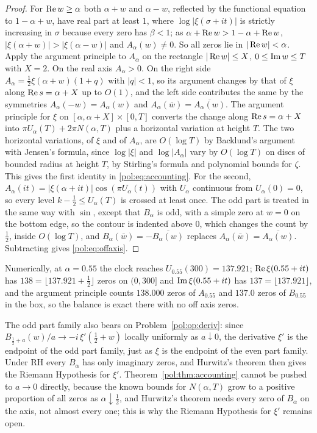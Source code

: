 \begin{proof}
For $\operatorname{Re} w\ge\alpha$ both $\alpha+w$ and $\alpha-w$, reflected by the functional equation to $1-\alpha+w$, have real part at least $1$, where $\log|\xi(\sigma+it)|$ is strictly increasing in $\sigma$ because every zero has $\beta<1$; as $\alpha+\operatorname{Re} w>1-\alpha+\operatorname{Re} w$, $|\xi(\alpha+w)|>|\xi(\alpha-w)|$ and $A_\alpha(w)\ne0$. So all zeros lie in $|\operatorname{Re} w|<\alpha$. Apply the argument principle to $A_\alpha$ on the rectangle $|\operatorname{Re} w|\le X$, $0\le\operatorname{Im} w\le T$ with $X=2$. On the real axis $A_\alpha>0$. On the right side $A_\alpha=\frac12\xi(\alpha+w)(1+q)$ with $|q|<1$, so its argument changes by that of $\xi$ along $\operatorname{Re} s=\alpha+X$ up to $O(1)$, and the left side contributes the same by the symmetries $A_\alpha(-w)=A_\alpha(w)$ and $A_\alpha(\bar w)=\overline{A_\alpha(w)}$. The argument principle for $\xi$ on $[\alpha,\alpha+X]\times[0,T]$ converts the change along $\operatorname{Re} s=\alpha+X$ into $\pi U_\alpha(T)+2\pi N(\alpha,T)$ plus a horizontal variation at height $T$. The two horizontal variations, of $\xi$ and of $A_\alpha$, are $O(\log T)$ by Backlund's argument \cite{Backlund} with Jensen's formula, since $\log|\xi|$ and $\log|A_\alpha|$ vary by $O(\log T)$ on discs of bounded radius at height $T$, by Stirling's formula and polynomial bounds for $\zeta$. This gives the first identity in \eqref{pol:eq:accounting}. For the second, $A_\alpha(it)=|\xi(\alpha+it)|\cos(\pi U_\alpha(t))$ with $U_\alpha$ continuous from $U_\alpha(0)=0$, so every level $k-\frac12\le U_\alpha(T)$ is crossed at least once. The odd part is treated in the same way with $\sin$, except that $B_\alpha$ is odd, with a simple zero at $w=0$ on the bottom edge, so the contour is indented above $0$, which changes the count by $\frac12$, inside $O(\log T)$, and $B_\alpha(\bar w)=-\overline{B_\alpha(w)}$ replaces $A_\alpha(\bar w)=\overline{A_\alpha(w)}$. Subtracting gives \eqref{pol:eq:offaxis}.
\end{proof}

Numerically, at $\alpha=0.55$ the clock reaches $U_{0.55}(300)=137.921$; $\operatorname{Re}\xi(0.55+it)$ has $138=\lfloor137.921+\frac12\rfloor$ zeros on $(0,300]$ and $\operatorname{Im}\xi(0.55+it)$ has $137=\lfloor137.921\rfloor$, and the argument principle counts $138.000$ zeros of $A_{0.55}$ and $137.0$ zeros of $B_{0.55}$ in the box, so the balance is exact there with no off axis zeros.

The odd part family also bears on Problem~\ref{pol:op:deriv}: since $B_{\frac12+a}(w)/a\to-i\,\xi'(\frac12+w)$ locally uniformly as $a\downarrow0$, the derivative $\xi'$ is the endpoint of the odd part family, just as $\xi$ is the endpoint of the even part family. Under RH every $B_\alpha$ has only imaginary zeros, and Hurwitz's theorem then gives the Riemann Hypothesis for $\xi'$. Theorem~\ref{pol:thm:accounting} cannot be pushed to $a\to0$ directly, because the known bounds for $N(\alpha,T)$ grow to a positive proportion of all zeros as $\alpha\downarrow\frac12$, and Hurwitz's theorem needs every zero of $B_\alpha$ on the axis, not almost every one; this is why the Riemann Hypothesis for $\xi'$ remains open.
